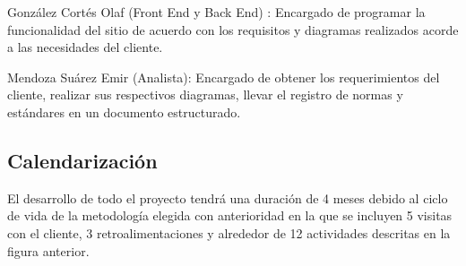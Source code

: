 González Cortés Olaf (Front End y Back End) : Encargado de programar la funcionalidad del sitio de acuerdo con los requisitos y diagramas realizados acorde a las necesidades del cliente.


Mendoza Suárez Emir (Analista): Encargado de obtener los requerimientos del cliente, realizar sus respectivos diagramas, llevar el registro de normas y estándares en un documento estructurado. 


\subsection{Calendarización}

El desarrollo de todo el proyecto tendrá una duración de 4 meses debido al ciclo de vida de la metodología elegida con anterioridad en la que se incluyen 5 visitas con el cliente, 3 retroalimentaciones y alrededor de 12 actividades descritas en la figura anterior.